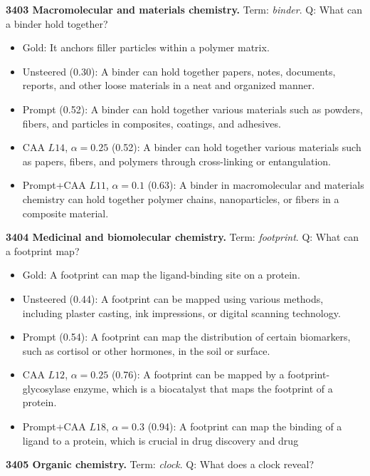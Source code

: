 \medskip\noindent\textbf{3403 Macromolecular and materials chemistry.} Term: \emph{binder}.
Q: What can a binder hold together?
\begin{itemize}\setlength{\itemsep}{0.15em}\setlength{\parsep}{0pt}\setlength{\topsep}{0.2em}
\item Gold: It anchors filler particles within a polymer matrix.
\item Unsteered (0.30): A binder can hold together papers, notes, documents, reports, and other loose materials in a neat and organized manner.
\item Prompt (0.52): A binder can hold together various materials such as powders, fibers, and particles in composites, coatings, and adhesives.
\item CAA $L14$, $\alpha=0.25$ (0.52): A binder can hold together various materials such as papers, fibers, and polymers through cross-linking or entangulation.
\item Prompt+CAA $L11$, $\alpha=0.1$ (0.63): A binder in macromolecular and materials chemistry can hold together polymer chains, nanoparticles, or fibers in a composite material.
\end{itemize}
\medskip\noindent\textbf{3404 Medicinal and biomolecular chemistry.} Term: \emph{footprint}.
Q: What can a footprint map?
\begin{itemize}\setlength{\itemsep}{0.15em}\setlength{\parsep}{0pt}\setlength{\topsep}{0.2em}
\item Gold: A footprint can map the ligand-binding site on a protein.
\item Unsteered (0.44): A footprint can be mapped using various methods, including plaster casting, ink impressions, or digital scanning technology.
\item Prompt (0.54): A footprint can map the distribution of certain biomarkers, such as cortisol or other hormones, in the soil or surface.
\item CAA $L12$, $\alpha=0.25$ (0.76): A footprint can be mapped by a footprint-glycosylase enzyme, which is a biocatalyst that maps the footprint of a protein.
\item Prompt+CAA $L18$, $\alpha=0.3$ (0.94): A footprint can map the binding of a ligand to a protein, which is crucial in drug discovery and drug
\end{itemize}
\medskip\noindent\textbf{3405 Organic chemistry.} Term: \emph{clock}.
Q: What does a clock reveal?
